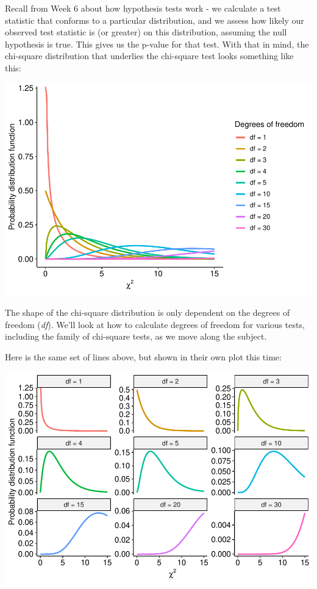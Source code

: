 \documentclass[
]{book}
\begin{document}
Recall from Week 6 about how hypothesis tests work - we calculate a test statistic that conforms to a particular distribution, and we assess how likely our observed test statistic is (or greater) on this distribution, assuming the null hypothesis is true. This gives us the p-value for that test. With that in mind, the chi-square distribution that underlies the chi-square test looks something like this:

\includegraphics{_main_files/figure-latex/unnamed-chunk-109-1.pdf}

The shape of the chi-square distribution is only dependent on the degrees of freedom (\emph{df}). We'll look at how to calculate degrees of freedom for various tests, including the family of chi-square tests, as we move along the subject.

Here is the same set of lines above, but shown in their own plot this time:

\includegraphics{_main_files/figure-latex/unnamed-chunk-110-1.pdf}
\end{document}
